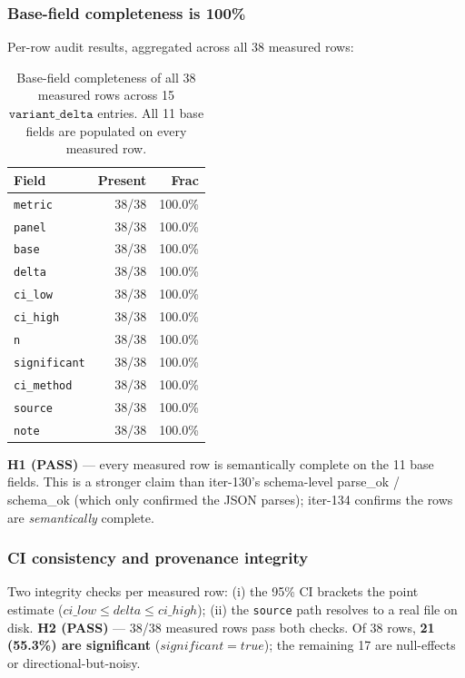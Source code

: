 \documentclass{article}
\begin{document}
\subsubsection{Base-field completeness is 100\%}
\label{sec:p6-iter134-base-fields}

Per-row audit results, aggregated across all 38 measured rows:

\begin{table}[h]
\centering
\small
\begin{tabular}{lrr}
\toprule
\textbf{Field} & \textbf{Present} & \textbf{Frac} \\
\midrule
\texttt{metric}        & 38/38 & 100.0\% \\
\texttt{panel}         & 38/38 & 100.0\% \\
\texttt{base}          & 38/38 & 100.0\% \\
\texttt{delta}         & 38/38 & 100.0\% \\
\texttt{ci\_low}       & 38/38 & 100.0\% \\
\texttt{ci\_high}      & 38/38 & 100.0\% \\
\texttt{n}             & 38/38 & 100.0\% \\
\texttt{significant}   & 38/38 & 100.0\% \\
\texttt{ci\_method}    & 38/38 & 100.0\% \\
\texttt{source}        & 38/38 & 100.0\% \\
\texttt{note}          & 38/38 & 100.0\% \\
\bottomrule
\end{tabular}
\caption{Base-field completeness of all 38 measured rows across 15
$\texttt{variant\_delta}$ entries. All 11 base fields are populated on
every measured row.}
\label{tab:p6-iter134-base-fields}
\end{table}

\textbf{H1 (PASS)} --- every measured row is semantically complete on the
11 base fields. This is a stronger claim than iter-130's
schema-level parse\_ok / schema\_ok (which only confirmed the JSON
parses); iter-134 confirms the rows are \emph{semantically} complete.

\subsubsection{CI consistency and provenance integrity}
\label{sec:p6-iter134-integrity}

Two integrity checks per measured row: (i) the 95\% CI brackets the point
estimate ($\mathit{ci\_low} \leq \mathit{delta} \leq \mathit{ci\_high}$);
(ii) the \texttt{source} path resolves to a real file on disk.
\textbf{H2 (PASS)} --- 38/38 measured rows pass both checks. Of 38 rows,
\textbf{21 (55.3\%) are significant} ($\mathit{significant} = \mathit{true}$);
the remaining 17 are null-effects or directional-but-noisy.
\end{document}
